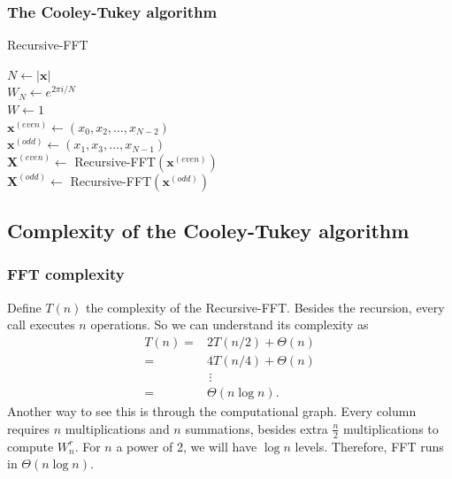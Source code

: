 \documentclass{beamer}
\begin{document}
\begin{frame}
    \frametitle{The Cooley-Tukey algorithm}
    \begin{algorithm}[H]
	\caption{Recursive-FFT}
	$N \gets |\bm{x}|$ \\
	$W_N \gets e^{2 \pi i / N}$ \\
	$W \gets  1$ \\
	$\bm{x}^{(even)} \gets \left( x_0, x_2, \ldots, x_{N-2} \right) $ \\
	$\bm{x}^{(odd)} \gets \left( x_1, x_3, \ldots, x_{N-1} \right) $ \\
	$\bm{X}^{(even)} \gets $ Recursive-FFT$\left( \bm{x}^{(even)}\right) $ \\
	$\bm{X}^{(odd)} \gets $ Recursive-FFT$\left(  \bm{x}^{(odd)}\right) $ \\
    \end{algorithm}
\end{frame}

\subsection{Complexity of the Cooley-Tukey algorithm}
\begin{frame}
    \frametitle{FFT complexity}
    Define $T\left( n \right) $ the complexity of the Recursive-FFT. Besides the recursion, every call executes $n$ operations. So we can understand its complexity as
    \begin{align*}
	T(n) = & 2T\left( n / 2 \right) + \Theta\left( n \right)  \\
	= & 4T\left( n / 4 \right) + \Theta\left( n \right)  \\
	& \,\vdots \\
	= & \Theta\left( n \log n \right)
    .\end{align*}
    Another way to see this is through the computational graph. Every column requires $n$ multiplications and $n$ summations, besides extra $\frac{n}{2}$ multiplications to compute $W_n^r$. For $n$ a power of 2, we will have $\log n$ levels. Therefore, FFT runs in $\Theta\left( n \log n \right) $.
\end{frame}
\end{document}

